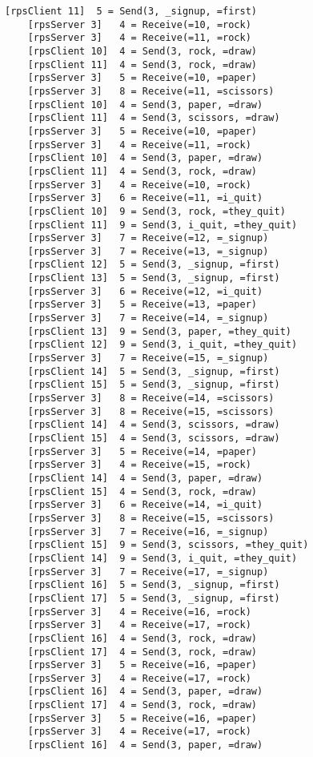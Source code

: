 \documentclass{article}
\begin{document}
\begin{Verbatim}[tabsize=4]
    [rpsClient 11]  5 = Send(3, _signup, =first)
    [rpsServer 3]   4 = Receive(=10, =rock)
    [rpsServer 3]   4 = Receive(=11, =rock)
    [rpsClient 10]  4 = Send(3, rock, =draw)
    [rpsClient 11]  4 = Send(3, rock, =draw)
    [rpsServer 3]   5 = Receive(=10, =paper)
    [rpsServer 3]   8 = Receive(=11, =scissors)
    [rpsClient 10]  4 = Send(3, paper, =draw)
    [rpsClient 11]  4 = Send(3, scissors, =draw)
    [rpsServer 3]   5 = Receive(=10, =paper)
    [rpsServer 3]   4 = Receive(=11, =rock)
    [rpsClient 10]  4 = Send(3, paper, =draw)
    [rpsClient 11]  4 = Send(3, rock, =draw)
    [rpsServer 3]   4 = Receive(=10, =rock)
    [rpsServer 3]   6 = Receive(=11, =i_quit)
    [rpsClient 10]  9 = Send(3, rock, =they_quit)
    [rpsClient 11]  9 = Send(3, i_quit, =they_quit)
    [rpsServer 3]   7 = Receive(=12, =_signup)
    [rpsServer 3]   7 = Receive(=13, =_signup)
    [rpsClient 12]  5 = Send(3, _signup, =first)
    [rpsClient 13]  5 = Send(3, _signup, =first)
    [rpsServer 3]   6 = Receive(=12, =i_quit)
    [rpsServer 3]   5 = Receive(=13, =paper)
    [rpsServer 3]   7 = Receive(=14, =_signup)
    [rpsClient 13]  9 = Send(3, paper, =they_quit)
    [rpsClient 12]  9 = Send(3, i_quit, =they_quit)
    [rpsServer 3]   7 = Receive(=15, =_signup)
    [rpsClient 14]  5 = Send(3, _signup, =first)
    [rpsClient 15]  5 = Send(3, _signup, =first)
    [rpsServer 3]   8 = Receive(=14, =scissors)
    [rpsServer 3]   8 = Receive(=15, =scissors)
    [rpsClient 14]  4 = Send(3, scissors, =draw)
    [rpsClient 15]  4 = Send(3, scissors, =draw)
    [rpsServer 3]   5 = Receive(=14, =paper)
    [rpsServer 3]   4 = Receive(=15, =rock)
    [rpsClient 14]  4 = Send(3, paper, =draw)
    [rpsClient 15]  4 = Send(3, rock, =draw)
    [rpsServer 3]   6 = Receive(=14, =i_quit)
    [rpsServer 3]   8 = Receive(=15, =scissors)
    [rpsServer 3]   7 = Receive(=16, =_signup)
    [rpsClient 15]  9 = Send(3, scissors, =they_quit)
    [rpsClient 14]  9 = Send(3, i_quit, =they_quit)
    [rpsServer 3]   7 = Receive(=17, =_signup)
    [rpsClient 16]  5 = Send(3, _signup, =first)
    [rpsClient 17]  5 = Send(3, _signup, =first)
    [rpsServer 3]   4 = Receive(=16, =rock)
    [rpsServer 3]   4 = Receive(=17, =rock)
    [rpsClient 16]  4 = Send(3, rock, =draw)
    [rpsClient 17]  4 = Send(3, rock, =draw)
    [rpsServer 3]   5 = Receive(=16, =paper)
    [rpsServer 3]   4 = Receive(=17, =rock)
    [rpsClient 16]  4 = Send(3, paper, =draw)
    [rpsClient 17]  4 = Send(3, rock, =draw)
    [rpsServer 3]   5 = Receive(=16, =paper)
    [rpsServer 3]   4 = Receive(=17, =rock)
    [rpsClient 16]  4 = Send(3, paper, =draw)

\end{Verbatim}
\end{document}
